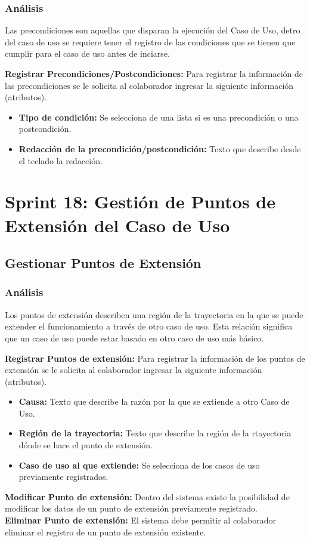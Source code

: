 \subsubsection {Análisis}
Las precondiciones son aquellas que disparan la ejecución del Caso de Uso, detro del caso de uso se requiere tener el registro de las condiciones que se tienen que cumplir para el caso de uso antes de inciarse.

\textbf {Registrar Precondiciones/Postcondiciones:}
Para registrar la información de las precondiciones se le solicita al colaborador ingresar la siguiente información (atributos).
\begin{itemize}
	\item \textbf{Tipo de condición:} Se selecciona de una lista si es una precondición o una postcondición.
	\item \textbf{Redacción de la precondición/postcondición:} Texto que describe desde el teclado la redacción.
\end{itemize}

\section{Sprint 18: Gestión de Puntos de Extensión del Caso de Uso}
\subsection{Gestionar Puntos de Extensión}
\subsubsection {Análisis}
Los puntos de extensión describen una región de la trayectoria en la que se puede extender el funcionamiento a través de otro caso de uso. Esta relación significa que un caso de uso puede estar basado en otro caso de uso más básico.

\textbf {Registrar Puntos de extensión:}
Para registrar la información de los puntos de extensión se le solicita al colaborador ingresar la siguiente información (atributos).
\begin{itemize}
	\item \textbf{Causa:} Texto que describe la razón por la que se extiende a otro Caso de Uso.
	\item \textbf{Región de la trayectoria:} Texto que describe la región de la rtayectoria dónde se hace el punto de extensión.
	\item \textbf{Caso de uso al que extiende:} Se selecciona de los casos de uso previamente registrados.
\end{itemize}

\textbf {Modificar Punto de extensión:}
Dentro del sistema existe la posibilidad de modificar los datos de un punto de extensión previamente registrado.\\

\textbf {Eliminar Punto de extensión:} 
El sistema debe permitir al colaborador eliminar el registro de un punto de extensión existente.\\
